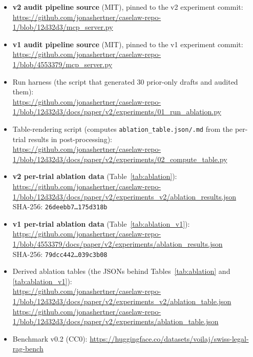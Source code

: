 \documentclass[11pt,a4paper]{article}
\begin{document}
\begin{itemize}\itemsep0pt
  \item \textbf{v2 audit pipeline source} (MIT), pinned to the
        v2 experiment commit: \\
        \url{https://github.com/jonashertner/caselaw-repo-1/blob/12d32d3/mcp_server.py}
  \item \textbf{v1 audit pipeline source} (MIT), pinned to the
        v1 experiment commit: \\
        \url{https://github.com/jonashertner/caselaw-repo-1/blob/4553379/mcp_server.py}
  \item Run harness (the script that generated 30 prior-only
        drafts and audited them): \\
        \url{https://github.com/jonashertner/caselaw-repo-1/blob/12d32d3/docs/paper/v2/experiments/01_run_ablation.py}
  \item Table-rendering script (computes
        \texttt{ablation\_table.json/.md} from the per-trial
        results in post-processing): \\
        \url{https://github.com/jonashertner/caselaw-repo-1/blob/12d32d3/docs/paper/v2/experiments/02_compute_table.py}
  \item \textbf{v2 per-trial ablation data} (Table~\ref{tab:ablation}): \\
        \url{https://github.com/jonashertner/caselaw-repo-1/blob/12d32d3/docs/paper/v2/experiments_v2/ablation\_results.json} \\
        SHA-256: \texttt{26deebb7\dots 175d318b}
  \item \textbf{v1 per-trial ablation data} (Table~\ref{tab:ablation_v1}): \\
        \url{https://github.com/jonashertner/caselaw-repo-1/blob/4553379/docs/paper/v2/experiments/ablation\_results.json} \\
        SHA-256: \texttt{79dcc442\dots 039c3b08}
  \item Derived ablation tables (the JSONs behind
        Tables~\ref{tab:ablation} and \ref{tab:ablation_v1}): \\
        \url{https://github.com/jonashertner/caselaw-repo-1/blob/12d32d3/docs/paper/v2/experiments_v2/ablation_table.json} \\
        \url{https://github.com/jonashertner/caselaw-repo-1/blob/12d32d3/docs/paper/v2/experiments/ablation_table.json}
  \item Benchmark v0.2 (CC0):
        \url{https://huggingface.co/datasets/voilaj/swiss-legal-rag-bench} \\

\end{itemize}
\end{document}
